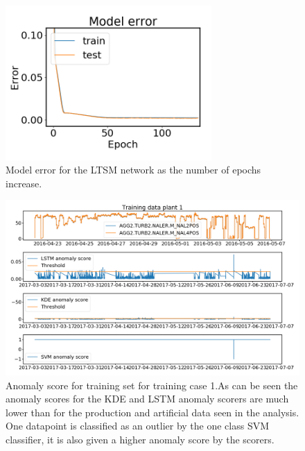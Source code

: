     
    \begin{figure}
        \centering
        \includegraphics[width=0.7\textwidth]{report/figures/analysis/plant1_training/lstm_model_error.png}
        \caption{Model error for the LTSM network as the number of epochs increase.}
        \label{fig:lstm_training_plant1}
    \end{figure}
    
    \begin{figure}
        \centering
        \includegraphics[width=\textwidth]{report/figures/analysis/plant1_training/training_data_anomaly.png}
        \caption{Anomaly score for training set for training case 1.As can be seen the anomaly scores for the KDE and LSTM anomaly scorers are much lower than for the production and artificial data seen in the analysis. One datapoint is classified as an outlier by the one class SVM classifier, it is also given a higher anomaly score by the scorers.}
        \label{fig:anomaly_training_plant1_case1}
    \end{figure}
    
